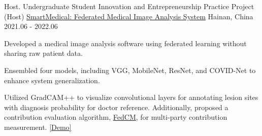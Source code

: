 \begin{cventries}
\cventry
{Host. Undergraduate Student Innovation and Entrepreneurship Practice Project (Host)}
{\href{https://www.bj-yan.top/paddle-fl-gui/}{SmartMedical: Federated Medical Image Analysis System}}
{Hainan, China}
{2021.06 - 2022.06}
{
\begin{cvitems}
\item {Developed a medical image analysis software using federated learning without sharing raw patient data.}
\item {Ensembled four models, including VGG, MobileNet, ResNet, and COVID-Net to enhance system generalization.}
\item {Utilized GradCAM++ to visualize convolutional layers for annotating lesion sites with diagnosis probability for doctor reference.
Additionally, proposed a contribution evaluation algorithm, \href{https://ieeexplore.ieee.org/abstract/document/9534451/}{FedCM}, for multi-party contribution measurement.
\textcolor{awesome-red}{\href{https://www.bj-yan.top/paddle-fl-gui/}{[Demo]}}
}
\end{cvitems}
}

\end{cventries}




